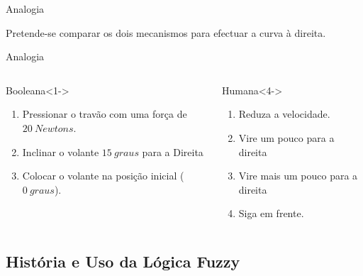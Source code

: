 \documentclass[portuges]{beamer}
\begin{document}
\begin{frame}{Analogia}
	\begin{example}
			\begin{figure}
			\centering
			\end{figure}

			Pretende-se comparar os dois mecanismos
			para efectuar a curva à direita.		 	
	\end{example}
\end{frame}
\begin{frame}{Analogia}
\begin{columns}[T]
  		\begin{column}{5cm}
		    \begin{block}{Booleana}<1->  				
				\begin{enumerate}[<+->]
					\item Pressionar o travão com uma força de $20\ Newtons$.
					\item Inclinar o volante $15\ graus$ para a Direita
					\item Colocar o volante na posição inicial ($0\ graus$).
				\end{enumerate}		
			\end{block}
		  \end{column}
		  \begin{column}{5cm}
		    \begin{block}{Humana}<4->
  			\begin{enumerate}[<+->]
					\item Reduza a velocidade.

					\item Vire \alert{um pouco} para a direita
					\item Vire \alert{mais um pouco} para a direita
					\item Siga em frente.
				\end{enumerate}		
		    \end{block}

		  \end{column}
		\end{columns}

\end{frame}


\subsection{História e Uso da Lógica Fuzzy}
\end{document}
